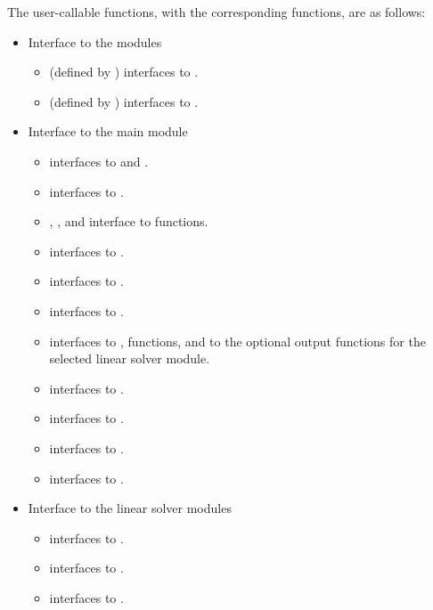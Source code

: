 The user-callable functions, with the corresponding {\ida} functions,
are as follows:
\begin{itemize}
\item
  Interface to the {\nvector} modules
  \begin{itemize}
  \item {} (defined by {\nvecs}) 
    interfaces to .
  \item {} (defined by {\nvecp}) 
    interfaces to .
  \end{itemize}
\item Interface to the main {\ida} module
  \begin{itemize}
  \item {}
    interfaces to  and .
  \item {}
    interfaces to .
  \item {}, , and 
    interface to  functions.    
  \item {}
    interfaces to .
  \item {}
    interfaces to .
  \item {}
    interfaces to .
  \item {}
    interfaces to ,  functions, and to the optional
    output functions for the selected linear solver module.
  \item {}
    interfaces to .
  \item {}
    interfaces to .
  \item {}
    interfaces to .
  \item {}    
    interfaces to .
  \end{itemize}
\item Interface to the linear solver modules
  \begin{itemize}
  \item {}
    interfaces to .
  \item {}
    interfaces to .
  \item {}
    interfaces to .

\end{itemize}
\end{itemize}
